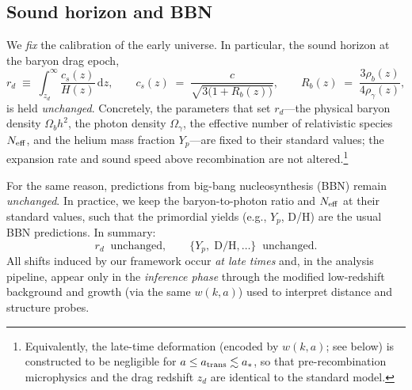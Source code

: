 \documentclass[11pt]{article}
\begin{document}
\subsection{Sound horizon and BBN}\label{sec:sound-horizon}
We \emph{fix} the calibration of the early universe. In particular, the sound horizon at the baryon drag epoch,
\begin{equation}
  r_d \;\equiv\; \int_{z_d}^{\infty} \frac{c_s(z)}{H(z)}\,\mathrm{d}z,
  \qquad
  c_s(z) \;=\; \frac{c}{\sqrt{3\bigl(1+R_b(z)\bigr)}},
  \qquad
  R_b(z)\;=\;\frac{3\rho_b(z)}{4\rho_\gamma(z)},
\end{equation}
is held \emph{unchanged}. Concretely, the parameters that set $r_d$---the physical baryon density $\Omega_bh^2$, the photon density $\Omega_\gamma$, the effective number of relativistic species $N_{\rm eff}$, and the helium mass fraction $Y_p$---are fixed to their standard values; the expansion rate and sound speed above recombination are not altered.\footnote{Equivalently, the late-time deformation (encoded by $w(k,a)$; see below) is constructed to be negligible for $a\le a_{\rm trans}\lesssim a_\ast$, so that pre-recombination microphysics and the drag redshift $z_d$ are identical to the standard model.}

For the same reason, predictions from big-bang nucleosynthesis (BBN) remain \emph{unchanged}. In practice, we keep the baryon-to-photon ratio and $N_{\rm eff}$ at their standard values, such that the primordial yields (e.g., $Y_p$, D/H) are the usual BBN predictions. In summary:
\begin{equation}
  r_d\;\; \text{unchanged}, 
  \qquad
  \{Y_p,\;\mathrm{D/H},\ldots\}\;\; \text{unchanged}.
\end{equation}
All shifts induced by our framework occur \emph{at late times} and, in the analysis pipeline, appear only in the \emph{inference phase} through the modified low-redshift background and growth (via the same $w(k,a)$) used to interpret distance and structure probes.
\end{document}
